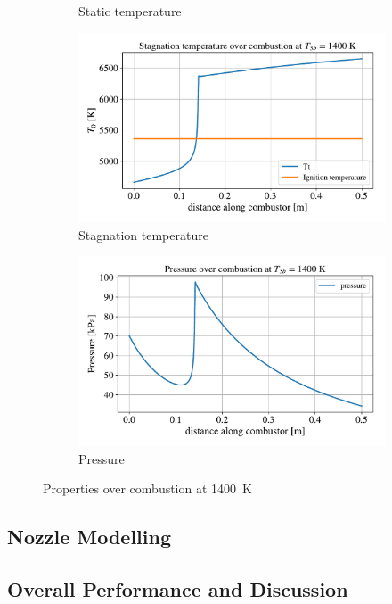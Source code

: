 \documentclass[a4paper]{article}
\begin{document}
\begin{figure}[h]
\begin{subfigure}[h]{0.49\linewidth}
        \caption{Static temperature}
        \label{subfig:temp_1400}
    \end{subfigure}
    \begin{subfigure}[h]{0.49\linewidth}
        \includegraphics[width=\linewidth]{part_2_img/stag_temp_1400.pdf}
        \caption{Stagnation temperature}
        \label{subfig:stag_temp_1400}
    \end{subfigure}
     \begin{subfigure}[h]{0.49\linewidth}
        \includegraphics[width=\linewidth]{part_2_img/pressure_1400.pdf}
        \caption{Pressure}
        \label{subfig:pressure_1400}
    \end{subfigure}
    \caption{Properties over combustion at 1400~K}
    \label{fig:properties_1400}
\end{figure}

\subsection{Nozzle Modelling}

\subsection{Overall Performance and Discussion}
\end{document}
